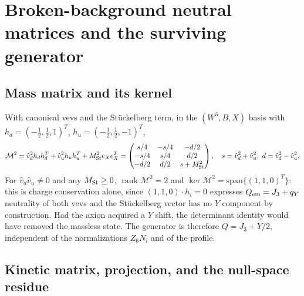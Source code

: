 \documentclass[11pt,letterpaper]{article}
\DeclareMathOperator{\rank}{rank}
\newcommand{\Mb}{\mathcal M}
\begin{document}
\section{Broken-background neutral matrices and the surviving generator}

\subsection{Mass matrix and its kernel}

With canonical vevs and the Stückelberg term, in the $(W^3,B,X)$ basis with $h_d=(-\tfrac12,\tfrac12,1)^{T}$, $h_u=(-\tfrac12,\tfrac12,-1)^{T}$,
\begin{equation}
\Mb^2=\hat v_d^2h_dh_d^{T}+\hat v_u^2h_uh_u^{T}+M_{\rm St}^2e_Xe_X^{T}
=\begin{pmatrix}s/4&-s/4&-d/2\\-s/4&s/4&d/2\\-d/2&d/2&s+M_{\rm St}^2\end{pmatrix},\quad s=\hat v_d^2+\hat v_u^2,\ d=\hat v_d^2-\hat v_u^2 .
\end{equation}
For $\hat v_d\hat v_u\ne0$ and any $M_{\rm St}\ge0$, $\rank\Mb^2=2$ and $\ker\Mb^2=\mathrm{span}\{(1,1,0)^{T}\}$: this is charge conservation alone, since $(1,1,0)\cdot h_i=0$ expresses $Q_{\rm em}=J_3+q_Y$ neutrality of both vevs and the Stückelberg vector has no $Y$ component by construction. Had the axion acquired a $Y$ shift, the determinant identity would have removed the massless state. The generator is therefore $Q=J_3+Y/2$, independent of the normalizations $Z_6N_i$ and of the profile.

\subsection{Kinetic matrix, projection, and the null-space residue}
\end{document}
